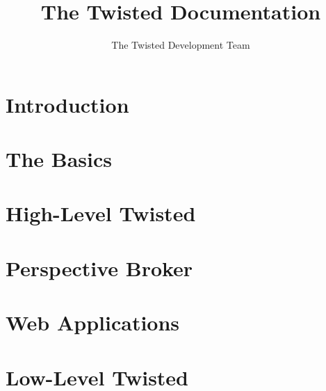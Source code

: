 \documentclass[oneside]{book}
\title{The Twisted Documentation}
\author{The Twisted Development Team}
\begin{document}
\maketitle
\tableofcontents

\chapter{Introduction}











\chapter{The Basics}









\chapter{High-Level Twisted}








\chapter{Perspective Broker}




\chapter{Web Applications}








\chapter{Low-Level Twisted }









\end{document}
